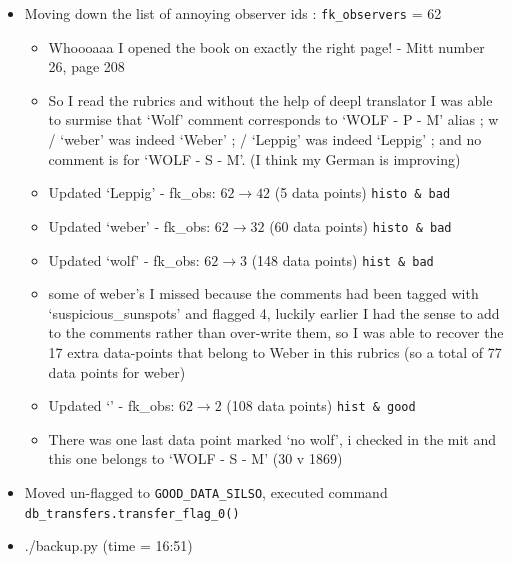 \documentclass[12pt]{article}
\begin{document}
\begin{itemize}
\begin{itemize}
    \end{itemize}
    \item Moving down the list of annoying observer ids : \texttt{fk\_observers} = 62
    \begin{itemize}
        \item Whoooaaa I opened the book on exactly the right page! - Mitt number 26, page 208
        \item So I read the rubrics and without the help of deepl translator I was able to surmise that `Wolf' comment corresponds to `WOLF - P - M' alias ; w / `weber' was indeed `Weber' ; \dag / `Leppig' was indeed `Leppig' ; and no comment is for `WOLF - S - M'. (I think my German is improving)
        \item Updated `Leppig' - fk\_obs: $62\to 42$ (5 data points) \texttt{histo \& bad}
        \item Updated `weber' - fk\_obs: $62\to 32$ (60 data points) \texttt{histo \& bad}
        \item Updated `wolf' - fk\_obs: $62\to 3$ (148 data points) \texttt{hist \& bad}
        \item some of weber's I missed because the comments had been tagged with `suspicious\_sunspots' and flagged 4, luckily earlier I had the sense to add to the comments rather than over-write them, so I was able to recover the 17 extra data-points that belong to Weber in this rubrics (so a total of 77 data points for weber)
        \item Updated `' - fk\_obs: $62\to 2$ (108 data points) \texttt{hist \& good}
        \item There was one last data point marked `no wolf', i checked in the mit and this one belongs to `WOLF - S - M' (30 v 1869) 
    \end{itemize}
    \item Moved un-flagged to \texttt{GOOD\_DATA\_SILSO}, executed command \texttt{db\_transfers.transfer\_flag\_0()}
    \item ./backup.py (time = 16:51)
\end{itemize}
\end{document}
